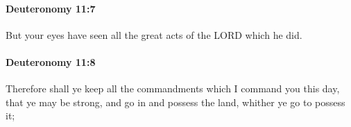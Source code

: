 		\paragraph{Deuteronomy 11:7} %
			\label{DEUTERONOMY-11-7}

			But your eyes have seen all the great acts of the LORD which he did.


		\paragraph{Deuteronomy 11:8} %
			\label{DEUTERONOMY-11-8}

			Therefore shall ye keep all the commandments which I command you this day, that ye may be strong, and go in and possess the land, whither ye go to possess it;


